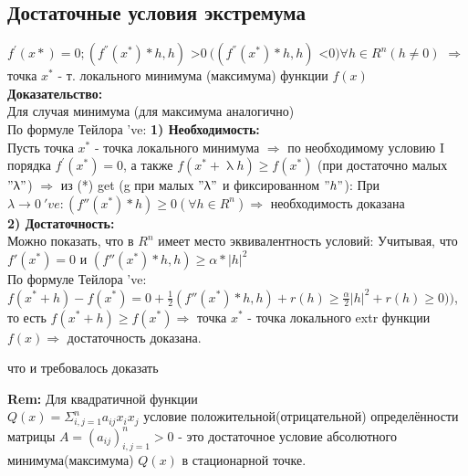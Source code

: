 \subsection{Достаточные условия экстремума} $f^{'}(x*)=0; (f^{''}(x^*)*h, h)$ \textgreater $0 \ ((f^{''}(x^*)*h, h)$ \textless $0) \forall h \in R^n (h \neq 0)$ $\Rightarrow $ точка $x^*$ - т. локального минимума (максимума) функции $f(x)$\\
\textbf{Доказательство:} \\
Для случая минимума (для максимума аналогично) \\
По формуле Тейлора 've:
\textbf{1) Необходимость:} \\
Пусть точка $x^*$ - точка локального минимума $\Rightarrow$ по необходимому условию I порядка $f^{'}(x^*)=0$, а также $f(x^* + \uplambda h) \geq f(x^*)$ (при достаточно малых $"\uplambda"$) $\Rightarrow$ из (*) get (g при малых $"\uplambda"$ и фиксированном $"h"$):
При $\lambda \rightarrow 0 \ 've: (f''(x^*)*h)\geq 0 (\forall h \in R^n) \Rightarrow $ необходимость доказана \\
\textbf{2) Достаточность:}\\
Можно показать, что в $R^n$ имеет место эквивалентность условий:
Учитывая, что $f'(x^*)=0$ и $(f''(x^*)*h,h)\geq \alpha * |h|^2$ \\
По формуле Тейлора 've:\\
$f(x^*+h)-f(x^*)=0+\frac{1}{2}(f''(x^*)*h,h)+r(h)\geq \frac{\alpha}{2}|h|^2+r(h) \geq 0))$, то есть $f(x^*+h) \geq f(x^*) \Rightarrow$ точка $x^*$ - точка локального extr функции $f(x) \Rightarrow$ достаточность доказана.
\begin{center}
что и требовалось доказать
\end{center}
\textbf{Rem:} 
Для квадратичной функции\\
$Q(x)=\Sigma^n_{i,j=1} a_{ij}x_i x_j$ условие положительной(отрицательной) определённости матрицы $A=(a_{ij})^n_{i,j=1}>0$ - это достаточное условие абсолютного минимума(максимума) $Q(x)$ в стационарной точке.

